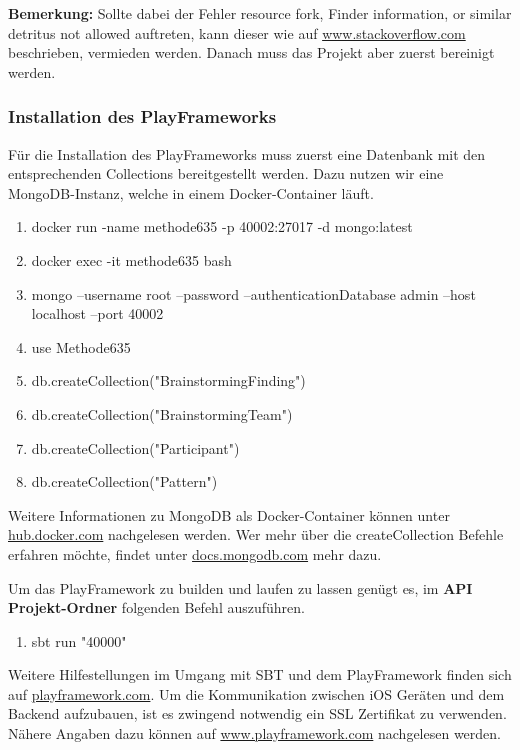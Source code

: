 \textbf{Bemerkung:} Sollte dabei der Fehler \grqq resource fork, Finder information, or similar detritus not allowed\grqq{} auftreten, kann dieser wie auf \href{https://stackoverflow.com/questions/39652867/code-sign-error-in-macos-high-sierra-xcode-resource-fork-finder-information}{www.stackoverflow.com} beschrieben, vermieden werden. Danach muss das Projekt aber zuerst bereinigt werden.

\subsubsection*{Installation des PlayFrameworks}
Für die Installation des PlayFrameworks muss zuerst eine Datenbank mit den entsprechenden Collections bereitgestellt werden. Dazu nutzen wir eine MongoDB-Instanz, welche in einem Docker-Container läuft.

\begin{enumerate}
  \item docker run -name methode635 -p 40002:27017 -d mongo:latest
  \item docker exec -it methode635 bash
  \item mongo --username root --password --authenticationDatabase admin --host localhost --port 40002
  \item use Methode635
  \item db.createCollection("BrainstormingFinding")
  \item db.createCollection("BrainstormingTeam")
  \item db.createCollection("Participant")
  \item db.createCollection("Pattern")
\end{enumerate}

Weitere Informationen zu MongoDB als Docker-Container können unter \href{https://hub.docker.com/_/mongo/}{hub.docker.com} nachgelesen werden. Wer mehr über die createCollection Befehle erfahren möchte, findet unter \href{https://docs.mongodb.com/manual/reference/method/db.createCollection/index.html}{docs.mongodb.com} mehr dazu.

Um das PlayFramework zu builden und laufen zu lassen genügt es, im \textbf{API Projekt-Ordner} folgenden Befehl auszuführen.

\begin{enumerate}
  \item sbt run "40000"
\end{enumerate}

Weitere Hilfestellungen im Umgang mit SBT und dem PlayFramework finden sich auf \href{https://www.playframework.com/documentation/2.6.x/PlayConsole}{playframework.com}. Um die Kommunikation zwischen iOS Geräten und dem Backend aufzubauen, ist es zwingend notwendig ein SSL Zertifikat zu verwenden. Nähere Angaben dazu können auf \href{https://www.playframework.com/documentation/2.6.x/ConfiguringHttps#SSL-Certificates}{www.playframework.com} nachgelesen werden.


